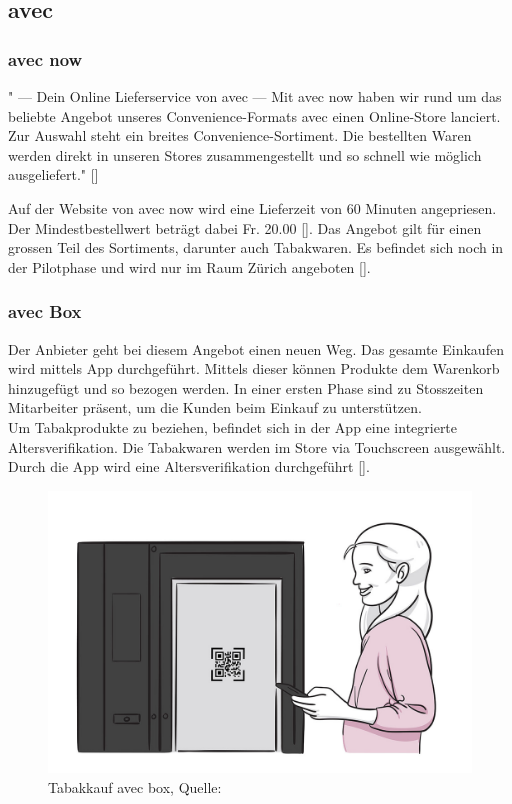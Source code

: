 \subsection{avec}
\subsubsection{avec now}
" — Dein Online Lieferservice von avec —
 Mit avec now haben wir rund um das beliebte Angebot unseres Convenience-Formats avec einen Online-Store lanciert.
 Zur Auswahl steht ein breites Convenience-Sortiment. Die bestellten Waren werden direkt in unseren Stores zusammengestellt und so schnell wie möglich ausgeliefert." [\cite{avecNow}]
 
 Auf der Website von avec now wird eine Lieferzeit von 60 Minuten angepriesen. Der Mindestbestellwert beträgt dabei Fr. 20.00 [\cite{avecNowMain}].
 Das Angebot gilt für einen grossen Teil des Sortiments, darunter auch Tabakwaren. Es befindet sich noch in der Pilotphase und wird nur im Raum Zürich angeboten [\cite{avecNowShipping}].
 
 \subsubsection{avec Box}\label{avecBox}
 Der Anbieter geht bei diesem Angebot einen neuen Weg. Das gesamte Einkaufen wird mittels App durchgeführt. Mittels dieser können Produkte dem Warenkorb hinzugefügt und so bezogen werden. In einer ersten Phase sind zu Stosszeiten Mitarbeiter präsent, um die Kunden beim Einkauf zu unterstützen.  \\
 Um Tabakprodukte zu beziehen, befindet sich in der App eine integrierte Altersverifikation. Die Tabakwaren werden im Store via Touchscreen ausgewählt. Durch die App wird eine Altersverifikation durchgeführt [\cite{avecBoxTabak}].
 \begin{figure}[H]
 	\centering
 	\includegraphics[width=1\textwidth]{images/tabakkaufAvecBox.jpg}
 	\caption[Tabakkauf avec box]{Tabakkauf avec box, Quelle: \cite{avecBoxTabak}}
 	\label{img: avec box tabakkauf}
 \end{figure}
 
